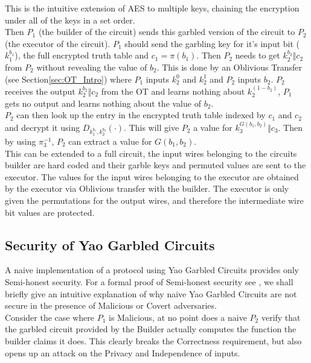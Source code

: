 \documentclass[a4paper,11pt]{article}
\begin{document}
			This is the intuitive extension of AES to multiple keys, chaining the encryption under all of the keys in a set order.\\

			Then $P_1$ (the builder of the circuit) sends this garbled version of the circuit to $P_2$ (the executor of the circuit). $P_1$ should send the garbling key for it's input bit ($k_1^{b_1}$), the full encrypted truth table and $c_1 = \pi(b_1)$. Then $P_2$ needs to get $k_2^{b_2} \Vert c_2$ from $P_2$ without revealing the value of $b_2$. This is done by an Oblivious Transfer (see Section\ref{sec:OT_Intro}) where $P_1$ inputs $k_2^0$ and $k_2^1$ and $P_2$ inputs $b_2$. $P_2$ receives the output $k_2^{b_2} \Vert c_2$ from the OT and learns nothing about $k_2^{(1 - b_2)} $, $P_1$ gets no output and learns nothing about the value of $b_2$.\\

			$P_2$ can then look up the entry in the encrypted truth table indexed by $c_1$ and $c_2$ and decrypt it using $D_{k_1^{b_1}, k_2^{b_2}}(\cdot)$. This will give $P_2$ a value for $k_3^{G(b_1, b_2)} \Vert c_3$. Then by using $\pi_3^{-1}$, $P_2$ can extract a value for $G(b_1, b_2)$.\\

			This can be extended to a full circuit, the input wires belonging to the circuits builder are hard coded and their garble keys and permuted values are sent to the executor. The values for the input wires belonging to the executor are obtained by the executor via Oblivious transfer with the builder. The executor is only given the permutations for the output wires, and therefore the intermediate wire bit values are protected.

		\subsection{Security of Yao Garbled Circuits} \label{sub:YaoSecurity}
			A naive implementation of a protocol using Yao Garbled Circuits provides only Semi-honest security. For a formal proof of Semi-honest security see \cite{ProofOfYaoSecurity}, we shall briefly give an intuitive explanation of why naive Yao Garbled Circuits are not secure in the presence of Malicious or Covert adversaries.\\

			Consider the case where $P_1$ is Malicious, at no point does a naive $P_2$ verify that the garbled circuit provided by the Builder actually computes the function the builder claims it does. This clearly breaks the Correctness requirement, but also opens up an attack on the Privacy and Independence of inputs.\\
\end{document}
